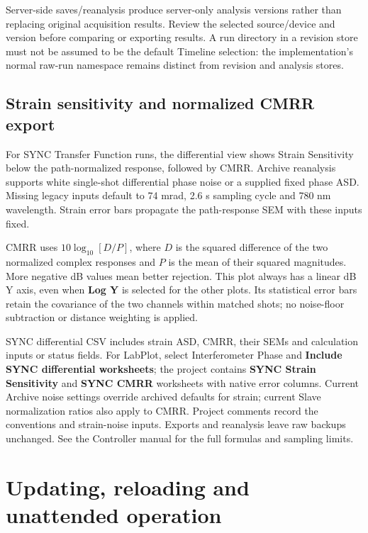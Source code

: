 \documentclass[11pt,oneside,openany]{book}
\newcommand{\ui}[1]{\textbf{#1}}
\begin{document}
Server-side saves/reanalysis produce server-only analysis versions rather than
replacing original acquisition results. Review the selected source/device and
version before comparing or exporting results. A run directory in a revision store
must not be assumed to be the default Timeline selection: the implementation's
normal raw-run namespace remains distinct from revision and analysis stores.

\section{Strain sensitivity and normalized CMRR export}
For SYNC Transfer Function runs, the differential view shows Strain Sensitivity
below the path-normalized response, followed by CMRR. Archive reanalysis supports
white single-shot differential phase noise or a supplied fixed phase ASD. Missing
legacy inputs default to 74 mrad, 2.6 s sampling cycle and 780 nm wavelength.
Strain error bars propagate the path-response SEM with these inputs fixed.

CMRR uses $10\log_{10}[D/P]$, where $D$ is the squared difference of the two
normalized complex responses and $P$ is the mean of their squared magnitudes.
More negative dB values mean better rejection. This plot always has a linear dB
Y axis, even when \ui{Log Y} is selected for the other plots. Its statistical
error bars retain the covariance of the two channels within matched shots; no
noise-floor subtraction or distance weighting is applied.

SYNC differential CSV includes strain ASD, CMRR, their SEMs and calculation inputs
or status fields. For LabPlot, select Interferometer Phase and
\ui{Include SYNC differential worksheets}; the project contains
\ui{SYNC Strain Sensitivity} and \ui{SYNC CMRR} worksheets with native error
columns. Current Archive noise settings override archived defaults for strain;
current Slave normalization ratios also apply to CMRR. Project comments record
the conventions and strain-noise inputs. Exports and reanalysis leave raw backups
unchanged. See the Controller manual for the full formulas and sampling limits.

\chapter{Updating, reloading and unattended operation}
\end{document}

